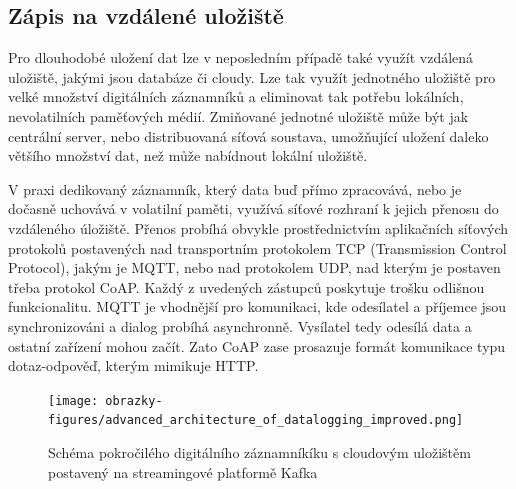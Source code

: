 \subsection{Zápis na vzdálené uložiště}
\label{zapis_na_vzdalene_uloziste}
Pro dlouhodobé uložení dat lze v neposledním případě také využít vzdálená uložiště, jakými jsou databáze či cloudy. Lze tak využít jednotného uložiště pro velké množství digitálních záznamníků a eliminovat tak potřebu lokálních, nevolatilních paměťových médií. Zmiňované jednotné uložiště může být jak centrální server, nebo distribuovaná síťová soustava, umožňující uložení daleko většího množství dat, než může nabídnout lokální uložiště.

V praxi dedikovaný záznamník, který data buď přímo zpracovává, nebo je dočasně uchovává v volatilní paměti, využívá síťové rozhraní k jejich přenosu do vzdáleného úložiště. Přenos probíhá obvykle prostřednictvím aplikačních síťových protokolů postavených nad transportním protokolem TCP (Transmission Control Protocol), jakým je MQTT, nebo nad protokolem UDP, nad kterým je postaven třeba protokol CoAP. Každý z uvedených zástupců poskytuje trošku odlišnou funkcionalitu. MQTT je vhodnější pro komunikaci, kde odesílatel a příjemce jsou synchronizováni a dialog probíhá asynchronně. Vysílatel tedy odesílá data a ostatní zařízení mohou začít. Zato CoAP zase prosazuje formát komunikace typu dotaz-odpověď, kterým mimikuje HTTP. \cite{emq_mqtt_vs_coap}


\begin{figure}[h]
    \centering
    \texttt{[image: obrazky-figures/advanced\_architecture\_of\_datalogging\_improved.png]}
    
    \caption{Schéma pokročilého digitálního záznamníkíku s cloudovým uložištěm postavený na streamingové platformě Kafka \cite{confluent_advanced_datalogging, influxdata_advanced_datalogging_mmqt}}
    \label{fig:advanced-architecture-of-datalogging}
\end{figure}


